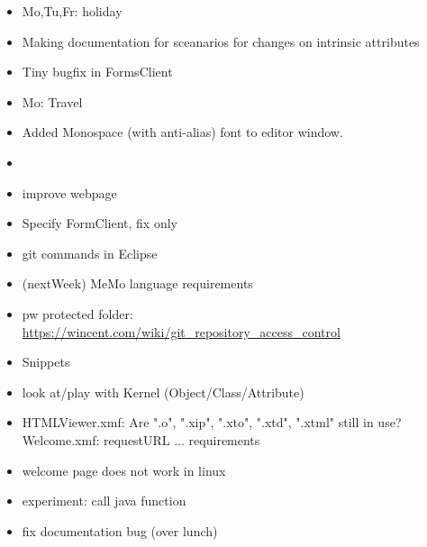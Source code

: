 \begin{itemize} 
\item Mo,Tu,Fr: holiday
\item Making documentation for sceanarios for changes on intrinsic attributes
\item Tiny bugfix in FormsClient
\end{itemize}

\begin{itemize} 
\item Mo: Travel
\item Added Monospace (with anti-alias) font to editor window.
\end{itemize}

\begin{itemize} 
\item
\end{itemize}

\begin{itemize}
\item improve webpage
\item Specify FormClient, fix only
\item git commands in Eclipse
\item (nextWeek) MeMo language requirements
\item pw protected folder: \url{https://wincent.com/wiki/git_repository_access_control}
\item Snippets
\item look at/play with Kernel (Object/Class/Attribute)
\item HTMLViewer.xmf: Are ".o", ".xip", ".xto", ".xtd", ".xtml" still in use?
Welcome.xmf: requestURL ...
requirements
\item welcome page does not work in linux
\item experiment: call java function
\item fix documentation bug (over lunch)
\end{itemize}
